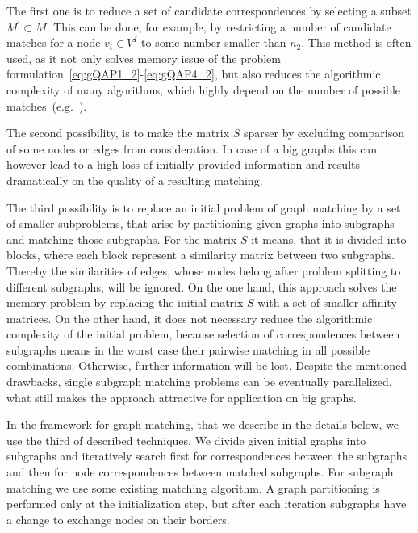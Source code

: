 The first one is to reduce a set of candidate correspondences by selecting a subset $M^\prime\subset M$. This can be done, for example, by restricting a number of candidate matches for a node $v_i\in V^I$ to some number smaller than $n_2$. This method is often used, as it not only solves memory issue of the problem formulation~\eqref{eq:gQAP1_2}-\eqref{eq:gQAP4_2}, but also reduces the algorithmic complexity of many algorithms, which highly depend on the number of possible matches~(e.g.~\cite{Cho2014_Haystack,Cho2010_RRWM,Cho2012_ProgressiveGM, Leordeanu2005_SM}).

The second possibility, is to make the matrix $S$ sparser by excluding comparison of some nodes or edges from consideration. In case of a big graphs this can however lead to a high loss of initially provided information and results dramatically on the quality of a resulting matching. 

The third possibility is to replace an initial problem of graph matching by a set of smaller subproblems, that arise by partitioning given graphs into subgraphs and matching those subgraphs. For the matrix $S$ it means, that it is divided into blocks, where each block represent a similarity matrix between two subgraphs. Thereby the similarities of edges, whose nodes belong after problem splitting to different subgraphs, will be ignored. On the one hand, this approach solves the memory problem by replacing the initial matrix $S$ with a set of smaller affinity matrices. On the other hand, it does not necessary reduce the algorithmic complexity of the initial problem, because selection of correspondences between subgraphs means in the worst case their pairwise matching in all possible combinations. Otherwise, further information will be lost. Despite the mentioned drawbacks, single subgraph matching problems can be eventually parallelized, what still makes the approach attractive for application on big graphs.

In the framework for graph matching, that we describe in the details below, we use the third of described techniques. We divide given initial graphs into subgraphs and iteratively search first for correspondences between the subgraphs and then for node correspondences between matched subgraphs. For subgraph matching we use some existing matching algorithm. A graph partitioning is performed only at the initialization step, but after each iteration subgraphs have a change to exchange nodes on their borders.

